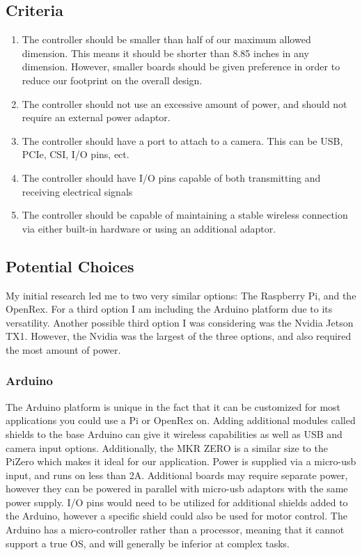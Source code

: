 \documentclass[onecolumn, draftclsnofoot,10pt, compsoc]{IEEEtran}
\begin{document}
\subsection{Criteria}
\begin{enumerate}
\item{The controller should  be smaller than half of our maximum 
allowed dimension. This means it should be shorter than 8.85 inches 
in any dimension. However, smaller boards should be given 
preference in order to reduce our footprint on the overall design.}

\item{The controller should not use an excessive amount of power, 
and should not require an external power adaptor. }

\item{The controller should have a port to attach to a camera. This 
can be USB, PCIe, CSI, I/O pins, ect.}

\item{The controller should have I/O pins capable of both 
transmitting and receiving electrical signals}

\item{The controller should be capable of maintaining a stable 
wireless connection via either built-in hardware or using an 
additional adaptor.}
\end{enumerate}

\subsection{Potential Choices}

My initial research led me to two very similar options: The 
Raspberry Pi, and the OpenRex. For a third option I am including 
the Arduino platform due to its versatility. Another possible third 
option I was considering was the Nvidia Jetson TX1. However, the 
Nvidia was the largest of the three options, and also required the 
most amount of power. 

\subsubsection{Arduino}


The Arduino platform\cite{r1} is unique in the fact that it can be 
customized for most applications you could use a Pi or OpenRex on. 
Adding additional modules called shields to the base Arduino can 
give it wireless capabilities as well as USB and camera input 
options. Additionally, the MKR ZERO is a similar size to the PiZero 
which makes it ideal for our application. Power is supplied via a 
micro-usb input, and runs on less than 2A. Additional boards may 
require separate power, however they can be powered in parallel 
with micro-usb adaptors with the same power supply. I/O pins would 
need to be utilized for additional shields added to the Arduino, 
however a specific shield could also be used for motor control. The 
Arduino has a micro-controller rather than a processor, meaning 
that it cannot support a true OS, and will generally be inferior at 
complex tasks. 
\end{document}
